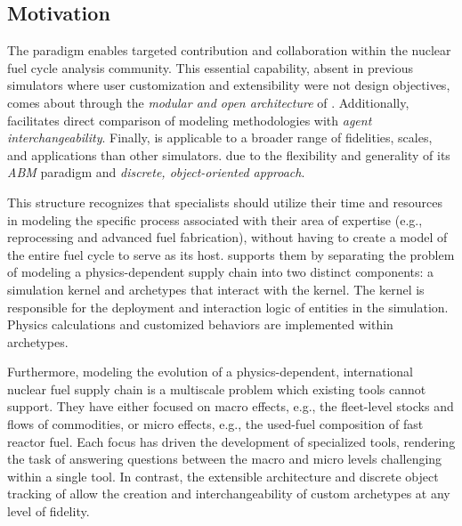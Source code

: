 

\subsection{Motivation}

The \Cyclus paradigm enables targeted contribution and collaboration within the
nuclear fuel cycle analysis community. This essential capability, absent in
previous simulators where user customization and extensibility were not design
objectives, comes about through the \emph{modular and open architecture} of
\Cyclus.  Additionally, \Cyclus facilitates direct comparison of modeling
methodologies with \emph{agent interchangeability}.  Finally, \Cyclus is
applicable to a broader range of fidelities, scales, and applications than
other simulators.  due to the flexibility and generality of its
\emph{\gls{ABM}} paradigm and \emph{discrete, object-oriented approach}.

This structure recognizes that specialists should utilize their time and
resources in modeling the specific process associated with their area of
expertise (e.g., reprocessing and advanced fuel fabrication), without having to
create a model of the entire fuel cycle to serve as its host.  \Cyclus supports
them by separating the problem of modeling a physics-dependent supply chain
into two distinct components: a simulation kernel and archetypes that interact
with the kernel. The kernel is responsible for the deployment and interaction
logic of entities in the simulation.  Physics calculations and customized
behaviors are implemented within archetypes.

Furthermore, modeling the evolution of a physics-dependent, international
nuclear fuel supply chain is a multiscale problem which existing tools cannot
support. They have either focused on macro effects, e.g., the fleet-level
stocks and flows of commodities, or micro effects, e.g., the used-fuel
composition of fast reactor fuel. Each focus has driven the development of
specialized tools, rendering the task of answering questions between the macro
and micro levels challenging within a single tool.  In contrast, the extensible
architecture and discrete object tracking of \Cyclus allow the creation and
interchangeability of custom archetypes at any level of fidelity.

